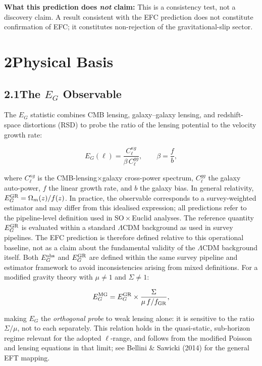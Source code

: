 \documentclass[11pt]{article}
\begin{document}
\textbf{What this prediction does \emph{not} claim:}
This is a consistency test, not a discovery claim. A result consistent
with the EFC prediction does not constitute confirmation of EFC;
it constitutes non-rejection of the gravitational-slip sector.

\section{2\quad Physical Basis}

\subsection{2.1\quad The $E_G$ Observable}

The $E_G$ statistic combines CMB lensing, galaxy--galaxy lensing,
and redshift-space distortions (RSD) to probe the ratio of the
lensing potential to the velocity growth rate:

\begin{equation}
E_G(\ell) = \frac{C_\ell^{\kappa g}}{\beta \, C_\ell^{gg}},
\qquad \beta = \frac{f}{b},
\label{eq:EG}
\end{equation}

where $C_\ell^{\kappa g}$ is the CMB-lensing$\times$galaxy
cross-power spectrum, $C_\ell^{gg}$ the galaxy auto-power,
$f$ the linear growth rate, and $b$ the galaxy bias.
In general relativity, $E_G^{\rm GR} = \Omega_m(z)/f(z)$.
In practice, the observable corresponds to a survey-weighted
estimator and may differ from this idealised expression; all
predictions refer to the pipeline-level definition used in
SO\,$\times$\,Euclid analyses.
The reference quantity $E_G^{\rm GR}$ is evaluated within a
standard $\Lambda$CDM background as used in survey pipelines.
The EFC prediction is therefore defined relative to this
operational baseline, not as a claim about the fundamental
validity of the $\Lambda$CDM background itself.
Both $E_G^{\rm obs}$ and $E_G^{\rm GR}$ are defined within
the same survey pipeline and estimator framework to avoid
inconsistencies arising from mixed definitions.
For a modified gravity theory with $\mu \ne 1$ and $\Sigma \ne 1$:

\begin{equation}
E_G^{\rm MG} = E_G^{\rm GR} \times \frac{\Sigma}{\mu \, f / f_{\rm GR}},
\label{eq:EGMG}
\end{equation}

making $E_G$ the \emph{orthogonal probe} to weak lensing alone:
it is sensitive to the ratio $\Sigma/\mu$, not to each separately.
This relation holds in the quasi-static, sub-horizon regime relevant
for the adopted $\ell$-range, and follows from the modified Poisson
and lensing equations in that limit; see Bellini \& Sawicki (2014)
for the general EFT mapping.
\end{document}
